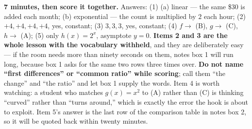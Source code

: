 \documentclass[10pt]{article}
\begin{document}
\boxguard[18]
\begin{teachernote}[Warm-Up]
    \textbf{7 minutes, then score it together.} Answers: (1) (a) linear --- the same \$30 is added
    each month; (b) exponential --- the count is multiplied by $2$ each hour; (2) $+4, +4, +4, +4$,
    yes, constant; (3) $3, 3, 3$, yes, constant; (4) $f \to$ (B), $g \to$ (C), $h \to$ (A); (5) only
    $h(x)=2^x$, asymptote $y=0$. \textbf{Items 2 and 3 are the whole lesson with the vocabulary
    withheld}, and they are deliberately easy --- if the room needs more than ninety seconds on them,
    notes box 1 will run long, because box 1 asks for the same two rows three times over. \textbf{Do
    not name ``first differences'' or ``common ratio'' while scoring}; call them ``the change'' and
    ``the ratio'' and let box 1 supply the words. Item 4 is worth watching: a student who matches
    $g(x)=x^2$ to (A) rather than (C) is thinking ``curved'' rather than ``turns around,'' which is
    exactly the error the hook is about to exploit. Item 5's answer is the last row of the comparison
    table in notes box 2, so it will be quoted back within twenty minutes.
\end{teachernote}
\end{document}

